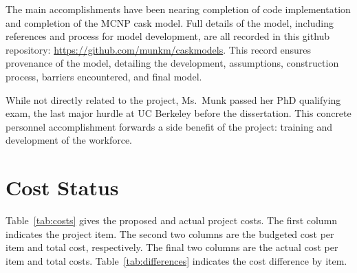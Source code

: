 \documentclass[12pt]{article}
\begin{document}
The main accomplishments have been nearing completion of code implementation and completion of the MCNP cask model. Full details of the model, including references and process for model development, are all recorded in this github repository: \href{https://github.com/munkm/caskmodels}{https://github.com/munkm/caskmodels}. This record ensures provenance of the model, detailing the development, assumptions, construction process, barriers encountered, and final model. 

While not directly related to the project, Ms.\ Munk passed her PhD qualifying exam, the last major hurdle at UC Berkeley before the dissertation. This concrete personnel accomplishment forwards a side benefit of the project: training and development of the workforce. 


\section{Cost Status}
\label{sect::cost}

Table~\ref{tab:costs} gives the proposed and actual project costs. The first column indicates the project item. The second two columns are the budgeted cost per item and total cost, respectively. The final two columns are the actual cost per item and total costs. Table~\ref{tab:differences} indicates the cost difference by item. 
\end{document}
